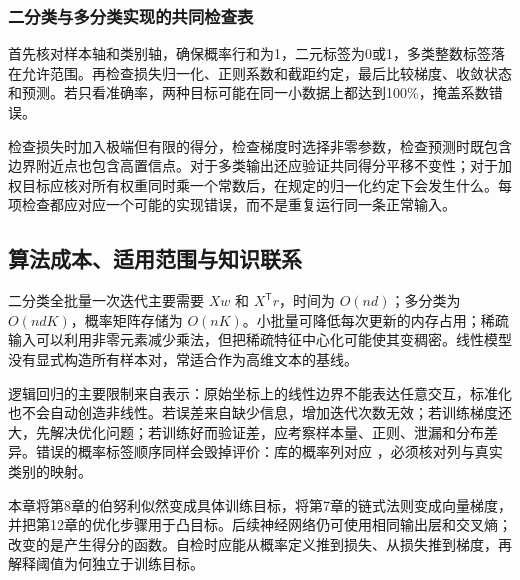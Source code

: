 \documentclass[UTF8,fontset=none,zihao=-4,a4paper]{ctexart}
\newcommand{\code}[1]{\texttt{\detokenize{#1}}}
\numberwithin{equation}{section}
\numberwithin{figure}{section}
\begin{document}
\subsubsection{二分类与多分类实现的共同检查表}
首先核对样本轴和类别轴，确保概率行和为1，二元标签为0或1，多类整数标签落在允许范围。再检查损失归一化、正则系数和截距约定，最后比较梯度、收敛状态和预测。若只看准确率，两种目标可能在同一小数据上都达到100\%，掩盖系数错误。

检查损失时加入极端但有限的得分，检查梯度时选择非零参数，检查预测时既包含边界附近点也包含高置信点。对于多类输出还应验证共同得分平移不变性；对于加权目标应核对所有权重同时乘一个常数后，在规定的归一化约定下会发生什么。每项检查都应对应一个可能的实现错误，而不是重复运行同一条正常输入。

\subsection{算法成本、适用范围与知识联系}
二分类全批量一次迭代主要需要 $Xw$ 和 $X^{\mathsf T}r$，时间为 $O(nd)$；多分类为 $O(ndK)$，概率矩阵存储为 $O(nK)$。小批量可降低每次更新的内存占用；稀疏输入可以利用非零元素减少乘法，但把稀疏特征中心化可能使其变稠密。线性模型没有显式构造所有样本对，常适合作为高维文本的基线。

逻辑回归的主要限制来自表示：原始坐标上的线性边界不能表达任意交互，标准化也不会自动创造非线性。若误差来自缺少信息，增加迭代次数无效；若训练梯度还大，先解决优化问题；若训练好而验证差，应考察样本量、正则、泄漏和分布差异。错误的概率标签顺序同样会毁掉评价：库的概率列对应 \code{classes_}，必须核对列与真实类别的映射。

本章将第8章的伯努利似然变成具体训练目标，将第7章的链式法则变成向量梯度，并把第12章的优化步骤用于凸目标。后续神经网络仍可使用相同输出层和交叉熵；改变的是产生得分的函数。自检时应能从概率定义推到损失、从损失推到梯度，再解释阈值为何独立于训练目标。
\end{document}
